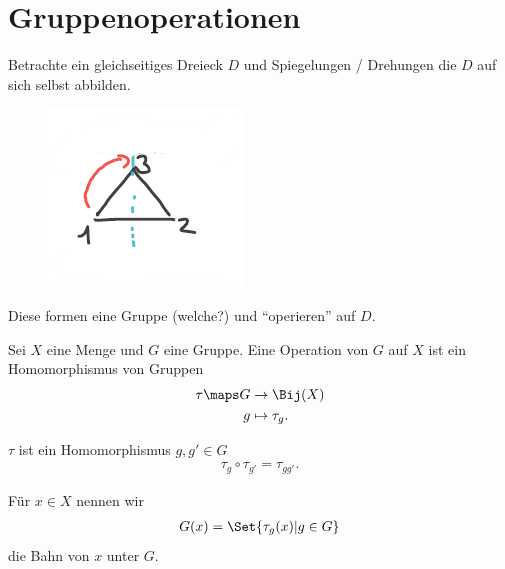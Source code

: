 \section*{Gruppenoperationen}
\begin{beispiel}\label{d_3}
    Betrachte ein gleichseitiges Dreieck \( D \) und Spiegelungen / Drehungen die \( D \) auf sich selbst abbilden.

    \begin{figure}[H]
        \centering
        \includegraphics[width=0.2\linewidth]{figures/d_3}
        \label{fig:d_3}
    \end{figure}
    Diese formen eine Gruppe (welche?) und \enquote{operieren} auf \( D \).
\end{beispiel}
\begin{definition}
    Sei \( X \) eine Menge und \( G \) eine Gruppe. 
    Eine Operation von \( G \) auf \( X \) ist ein Homomorphismus von Gruppen
    \begin{align*}
        \tau\maps \begin{aligned}[t] 
            G&\to \Bij(X)\\
            g&\mapsto \tau_g.
        \end{aligned}
    \end{align*}
\end{definition}
\begin{bemerkung*}
    \( \tau \) ist ein Homomorphismus \dh \tforall \( g, g' \in G \)
    \begin{align*}
        \tau_g\circ \tau_{g'}=\tau_{gg'}.
    \end{align*}
    
    Für \( x\in X \) nennen wir
    \begin{align*}
        G(x)=\Set{\tau_g(x)|g\in G}
    \end{align*}
    die Bahn von \( x \) unter \( G \).
\end{bemerkung*}
